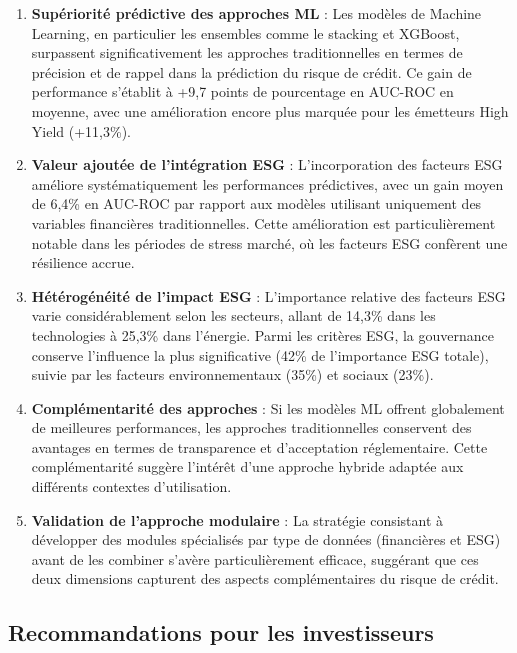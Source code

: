 \begin{enumerate}
  \item \textbf{Supériorité prédictive des approches ML} : Les modèles de Machine Learning, en particulier les ensembles comme le stacking et XGBoost, surpassent significativement les approches traditionnelles en termes de précision et de rappel dans la prédiction du risque de crédit. Ce gain de performance s'établit à +9,7 points de pourcentage en AUC-ROC en moyenne, avec une amélioration encore plus marquée pour les émetteurs High Yield (+11,3\%).

  \item \textbf{Valeur ajoutée de l'intégration ESG} : L'incorporation des facteurs ESG améliore systématiquement les performances prédictives, avec un gain moyen de 6,4\% en AUC-ROC par rapport aux modèles utilisant uniquement des variables financières traditionnelles. Cette amélioration est particulièrement notable dans les périodes de stress marché, où les facteurs ESG confèrent une résilience accrue.

  \item \textbf{Hétérogénéité de l'impact ESG} : L'importance relative des facteurs ESG varie considérablement selon les secteurs, allant de 14,3\% dans les technologies à 25,3\% dans l'énergie. Parmi les critères ESG, la gouvernance conserve l'influence la plus significative (42\% de l'importance ESG totale), suivie par les facteurs environnementaux (35\%) et sociaux (23\%).

  \item \textbf{Complémentarité des approches} : Si les modèles ML offrent globalement de meilleures performances, les approches traditionnelles conservent des avantages en termes de transparence et d'acceptation réglementaire. Cette complémentarité suggère l'intérêt d'une approche hybride adaptée aux différents contextes d'utilisation.

  \item \textbf{Validation de l'approche modulaire} : La stratégie consistant à développer des modules spécialisés par type de données (financières et ESG) avant de les combiner s'avère particulièrement efficace, suggérant que ces deux dimensions capturent des aspects complémentaires du risque de crédit.
\end{enumerate}

\subsection*{Recommandations pour les investisseurs}

